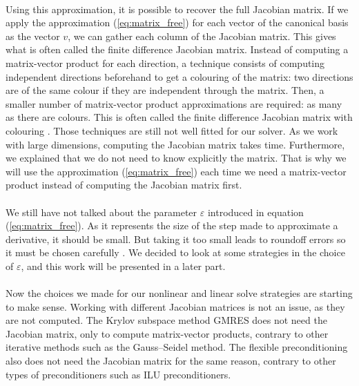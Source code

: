       \paragraph{}
      Using this approximation, it is possible to recover the full Jacobian matrix.
      If we apply the approximation (\ref{eq:matrix_free}) for each vector of the canonical basis as the vector $v$, we can gather each column of the Jacobian matrix.
      This gives what is often called the finite difference Jacobian matrix.
      Instead of computing a matrix-vector product for each direction, a technique consists of computing independent directions beforehand to get a colouring of the matrix: two directions are of the same colour if they are independent through the matrix.
      Then, a smaller number of matrix-vector product approximations are required: as many as there are colours.
      This is often called the finite difference Jacobian matrix with colouring \cite{GebremedhinMannePothen2005}.
      Those techniques are still not well fitted for our solver.
      As we work with large dimensions, computing the Jacobian matrix takes time.
      Furthermore, we explained that we do not need to know explicitly the matrix.
      That is why we will use the approximation (\ref{eq:matrix_free}) each time we need a matrix-vector product instead of computing the Jacobian matrix first.

      \paragraph{}
      We still have not talked about the parameter $\varepsilon$ introduced in equation (\ref{eq:matrix_free}).
      As it represents the size of the step made to approximate a derivative, it should be small.
      But taking it too small leads to roundoff errors so it must be chosen carefully \cite{KnollKeyes2004}.
      We decided to look at some strategies in the choice of $\varepsilon$, and this work will be presented in a later part.

      \paragraph{}
      Now the choices we made for our nonlinear and linear solve strategies are starting to make sense.
      Working with different Jacobian matrices is not an issue, as they are not computed.
      The Krylov subspace method GMRES does not need the Jacobian matrix, only to compute matrix-vector products, contrary to other iterative methods such as the Gauss--Seidel method.
      The flexible preconditioning also does not need the Jacobian matrix for the same reason, contrary to other types of preconditioners such as ILU preconditioners.

